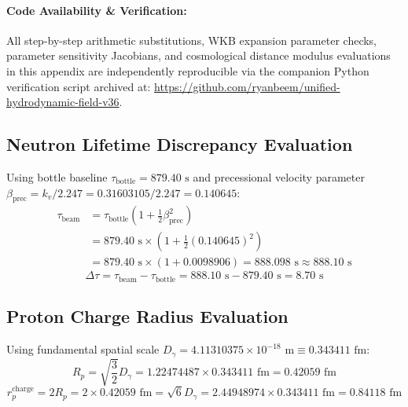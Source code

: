 \documentclass[11pt,a4paper]{article}
\begin{document}
	\paragraph{Code Availability \& Verification:}
	All step-by-step arithmetic substitutions, WKB expansion parameter checks, parameter sensitivity Jacobians, and cosmological distance modulus evaluations in this appendix are independently reproducible via the companion Python verification script archived at: \url{https://github.com/ryanbeem/unified-hydrodynamic-field-v36}.
	
	\subsection{Neutron Lifetime Discrepancy Evaluation}
	Using bottle baseline $\tau_{\text{bottle}} = 879.40\text{ s}$ and precessional velocity parameter $\beta_{\text{prec}} = k_v / 2.247 = 0.31603105 / 2.247 = 0.140645$:
	\begin{align}
		\tau_{\text{beam}} &= \tau_{\text{bottle}} \left(1 + \frac{1}{2} \beta_{\text{prec}}^2\right) \nonumber \\
		&= 879.40\text{ s} \times \left(1 + \frac{1}{2}(0.140645)^2\right) \nonumber \\
		&= 879.40\text{ s} \times (1 + 0.0098906) = 888.098\text{ s} \approx 888.10\text{ s}
	\end{align}
	\begin{equation}
		\Delta\tau = \tau_{\text{beam}} - \tau_{\text{bottle}} = 888.10\text{ s} - 879.40\text{ s} = 8.70\text{ s}
	\end{equation}
	
	\subsection{Proton Charge Radius Evaluation}
	Using fundamental spatial scale $D_\gamma = 4.11310375 \times 10^{-18}\text{ m} \equiv 0.343411\text{ fm}$:
	\begin{equation}
		R_p = \sqrt{\frac{3}{2}} D_\gamma = 1.22474487 \times 0.343411\text{ fm} = 0.42059\text{ fm}
	\end{equation}
	\begin{equation}
		r_p^{\text{charge}} = 2 R_p = 2 \times 0.42059\text{ fm} = \sqrt{6} D_\gamma = 2.44948974 \times 0.343411\text{ fm} = 0.84118\text{ fm}
	\end{equation}
	
\end{document}

